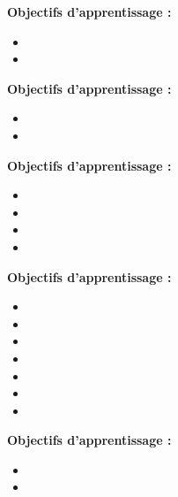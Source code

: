 \par\noindent\textbf{Objectifs d'apprentissage :}
\begin{itemize}
    \item \useobj[C4A1bg]
    \item \useobj[C4A1bh]
\end{itemize}
\endsequence

\par\noindent\textbf{Objectifs d'apprentissage :}
\begin{itemize}
    \item \useobj[C4B1ca]
    \item \useobj[C4B1cb]
\end{itemize}
\endsequence

\par\noindent\textbf{Objectifs d'apprentissage :}
\begin{itemize}
    \item \useobj[C4A1bi]
    \item \useobj[C4A1bk]
    \item \useobj[C4A1bl]
    \item \useobj[C4A1bm]
\end{itemize}
\endsequence

\par\noindent\textbf{Objectifs d'apprentissage :}
\begin{itemize}
    \item \useobj[C4A1ej]
    \item \useobj[C4A1ek]
    \item \useobj[C4A1el]
    \item \useobj[C4A1ee]
    \item \useobj[C4A1eg]
    \item \useobj[C4A1eh]
    \item \useobj[C4A1ei]
\end{itemize}
\endsequence

\par\noindent\textbf{Objectifs d'apprentissage :}
\begin{itemize}
    \item \useobj[C4D1af]
    \item \useobj[C4D1bh]
\end{itemize}
\endsequence


